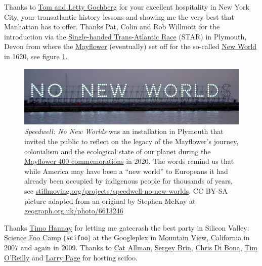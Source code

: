 \documentclass[
]{book}
\begin{document}
Thanks to \href{https://wi.mit.edu/news/memoriam-thomas-gochberg}{Tom and Letty Gochberg} for your excellent hospitality in New York City, your transatlantic history lessons and showing me the very best that Manhattan has to offer. Thanks Pat, Colin and Rob Willmott for the introduction via the \href{https://en.wikipedia.org/wiki/Single-Handed_Trans-Atlantic_Race}{Single-handed Trans-Atlantic Race} (STAR) in Plymouth, Devon from where the \href{https://en.wikipedia.org/wiki/Mayflower}{Mayflower} (eventually) set off for the so-called \href{https://en.wikipedia.org/wiki/New_World}{New World} in 1620, see figure \ref{fig:neworld-fig}.

\begin{figure}

{\centering \includegraphics[width=0.99\linewidth]{images/no-new-world} 

}

\caption{\emph{Speedwell: No New Worlds} was an installation in Plymouth that invited the public to reflect on the legacy of the Mayflower's journey, colonialism and the ecological state of our planet during the \href{https://www.mayflower400uk.org/}{Mayflower 400 commemorations} in 2020. The words remind us that while America may have been a ``new world'' to Europeans it had already been occupied by indigenous people for thousands of years, see \href{https://stillmoving.org/projects/speedwell-no-new-worlds}{stillmoving.org/projects/speedwell-no-new-worlds}. CC BY-SA picture adapted from an original by Stephen McKay at \href{https://www.geograph.org.uk/photo/6613246}{geograph.org.uk/photo/6613246}}\label{fig:neworld-fig}
\end{figure}



Thanks \href{https://en.wikipedia.org/wiki/Timo_Hannay}{Timo Hannay} for letting me gatecrash the best party in Silicon Valley: \href{https://en.wikipedia.org/wiki/Science_Foo_Camp}{Science Foo Camp} (\texttt{scifoo}) at the Googleplex in \href{https://en.wikipedia.org/wiki/Mountain_View,_California}{Mountain View, California} in 2007 and again in 2009. Thanks to \href{https://en.wikipedia.org/wiki/Cat_Allman}{Cat Allman}, \href{https://en.wikipedia.org/wiki/Sergey_Brin}{Sergey Brin}, \href{https://en.wikipedia.org/wiki/Chris_DiBona}{Chris Di Bona}, \href{https://en.wikipedia.org/wiki/Tim_O\%27Reilly}{Tim O'Reilly} and \href{https://en.wikipedia.org/wiki/Larry_Page}{Larry Page} for hosting scifoo.
\end{document}
